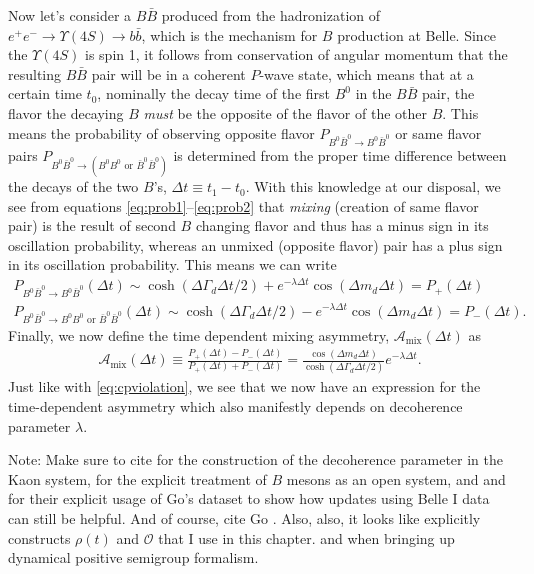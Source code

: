 Now let's consider a $B\bar{B}$ produced from the hadronization of $e^+e^-\rightarrow \Upsilon(4S)\rightarrow b\bar{b}$, which is the mechanism for $B$ production at Belle. Since the $\Upsilon(4S)$ is spin 1, it follows from conservation of angular momentum that the resulting $B\bar{B}$ pair will be in a coherent $P$-wave state, which means that at a certain time $t_0$, nominally the decay time of the first $B^0$ in the $B\bar{B}$ pair, the flavor the decaying $B$ \textit{must} be the opposite of the flavor of the other $B$. This means the probability of observing opposite flavor $P_{B^0\bar{B}^0\rightarrow B^0\bar{B}^0}$ or same flavor pairs $P_{B^0\bar{B}^0\rightarrow (B^0B^0 \text{ or } \bar{B}^0\bar{B}^0)}$ is determined from the proper time difference between the decays of the two $B$'s, $\Delta t\equiv t_1-t_0$. With this knowledge at our disposal, we see from equations \ref{eq:prob1}--\ref{eq:prob2} that \textit{mixing} (creation of same flavor pair) is the result of second $B$ changing flavor and thus has a minus sign in its oscillation probability, whereas an unmixed (opposite flavor) pair has a plus sign in its oscillation probability. This means we can write
\begin{align}
P_{B^{0}\bar{B}^0\rightarrow B^{0}\bar{B}^0}(\Delta t) \sim \cosh(\Delta \Gamma_d \Delta t/2)+e^{-\lambda \Delta t}\cos(\Delta m_d\Delta t) = P_+(\Delta t)\\
P_{B^{0}\bar{B}^0\rightarrow B^{0}B^0\text{ or } \bar{B}^0\bar{B}^0}(\Delta t) \sim \cosh(\Delta \Gamma_d \Delta t/2)-e^{-\lambda \Delta t}\cos(\Delta m_d\Delta t) = P_-(\Delta t).
\end{align}
Finally, we now define the time dependent mixing asymmetry, $\mathcal{A}_\text{mix}(\Delta t)$ as
\begin{align}
\mathcal{A}_\text{mix}(\Delta t)\equiv \frac{P_+(\Delta t)-P_-(\Delta t)}{P_+(\Delta t)+P_-(\Delta t)} = \frac{\cos(\Delta m_d\Delta t)}{\cosh(\Delta \Gamma_d \Delta t/2)}e^{-\lambda\Delta t}.
\end{align}
Just like with \ref{eq:cpviolation}, we see that we now have an expression for the time-dependent asymmetry which also manifestly depends on decoherence parameter $\lambda$.

Note: Make sure to cite \cite{Bertlmann} for the construction of the decoherence parameter in the Kaon system, \cite{Banerjee} for the explicit treatment of $B$ mesons as an open system, \cite{Benatti} and \cite{Dixit} and \cite{ALOK} for their explicit usage of Go's dataset to show how updates using Belle I data can still be helpful. And of course, cite Go \cite{Go}. Also, also, it looks like \cite{Naikoo} explicitly constructs $\rho(t)$ and $\mathcal{O}$ that I use in this chapter. \cite{Lindblad} and \cite{Gorini} when bringing up dynamical positive semigroup formalism. 

